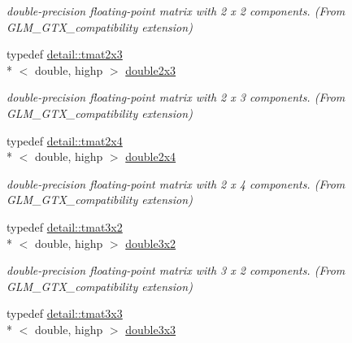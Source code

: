 \begin{DoxyCompactItemize}
\begin{DoxyCompactList}\small\item\em double-\/precision floating-\/point matrix with 2 x 2 components. (From G\-L\-M\-\_\-\-G\-T\-X\-\_\-compatibility extension) \end{DoxyCompactList}\item 
\hypertarget{group__gtx__compatibility_gac267cd849a60e6e96350aa5fd665d5ef}{typedef \hyperlink{structglm_1_1detail_1_1tmat2x3}{detail\-::tmat2x3}\\*
$<$ double, highp $>$ \hyperlink{group__gtx__compatibility_gac267cd849a60e6e96350aa5fd665d5ef}{double2x3}}\label{group__gtx__compatibility_gac267cd849a60e6e96350aa5fd665d5ef}

\begin{DoxyCompactList}\small\item\em double-\/precision floating-\/point matrix with 2 x 3 components. (From G\-L\-M\-\_\-\-G\-T\-X\-\_\-compatibility extension) \end{DoxyCompactList}\item 
\hypertarget{group__gtx__compatibility_ga063ad3c07c7650955da6ec55819f11fe}{typedef \hyperlink{structglm_1_1detail_1_1tmat2x4}{detail\-::tmat2x4}\\*
$<$ double, highp $>$ \hyperlink{group__gtx__compatibility_ga063ad3c07c7650955da6ec55819f11fe}{double2x4}}\label{group__gtx__compatibility_ga063ad3c07c7650955da6ec55819f11fe}

\begin{DoxyCompactList}\small\item\em double-\/precision floating-\/point matrix with 2 x 4 components. (From G\-L\-M\-\_\-\-G\-T\-X\-\_\-compatibility extension) \end{DoxyCompactList}\item 
\hypertarget{group__gtx__compatibility_ga1f70107ac850f512ac4e09737e1f85b7}{typedef \hyperlink{structglm_1_1detail_1_1tmat3x2}{detail\-::tmat3x2}\\*
$<$ double, highp $>$ \hyperlink{group__gtx__compatibility_ga1f70107ac850f512ac4e09737e1f85b7}{double3x2}}\label{group__gtx__compatibility_ga1f70107ac850f512ac4e09737e1f85b7}

\begin{DoxyCompactList}\small\item\em double-\/precision floating-\/point matrix with 3 x 2 components. (From G\-L\-M\-\_\-\-G\-T\-X\-\_\-compatibility extension) \end{DoxyCompactList}\item 
\hypertarget{group__gtx__compatibility_ga2b56fa7536ae728c64fde99d6618139a}{typedef \hyperlink{structglm_1_1detail_1_1tmat3x3}{detail\-::tmat3x3}\\*
$<$ double, highp $>$ \hyperlink{group__gtx__compatibility_ga2b56fa7536ae728c64fde99d6618139a}{double3x3}}\label{group__gtx__compatibility_ga2b56fa7536ae728c64fde99d6618139a}


\end{DoxyCompactItemize}
